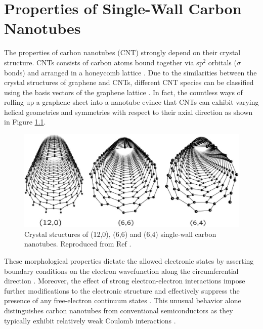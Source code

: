 \chapter{Properties of Single-Wall Carbon Nanotubes}

The properties of carbon nanotubes (CNT) strongly depend on their crystal structure. CNTs consists of carbon atoms bound together via sp$^2$ orbitals ($\sigma$ bonds) and arranged in a honeycomb lattice \cite{soavi2016ultrafast}. Due to the similarities between the crystal structures of graphene and CNTs, different CNT species can be classified using the basis vectors of the graphene lattice \cite{charlier2007electronic}. In fact, the countless ways of rolling up a graphene sheet into a nanotube evince that CNTs can exhibit varying helical geometries and symmetries with respect to their axial direction as shown in Figure \ref{fig:symmetries}. 

\begin{figure}[h]
	\centering
	\includegraphics[scale=0.4]{images/chapter_optical_props/nanotube_symmetries_charlier}
	\caption{Crystal structures of (12,0), (6,6) and (6,4) single-wall carbon nanotubes. Reproduced from Ref \cite{charlier2007electronic}.}
	\label{fig:symmetries}
\end{figure}

These morphological properties dictate the allowed electronic states by asserting boundary conditions on the electron wavefunction along the circumferential direction \cite{charlier2007electronic}. Moreover, the effect of strong electron-electron interactions impose further modifications to the electronic structure and effectively suppress the presence of any free-electron continuum states \cite{ando1997excitons}. This unusual behavior alone distinguishes carbon nanotubes from conventional semiconductors as they typically exhibit relatively weak Coulomb interactions \cite{ando1997excitons}.



